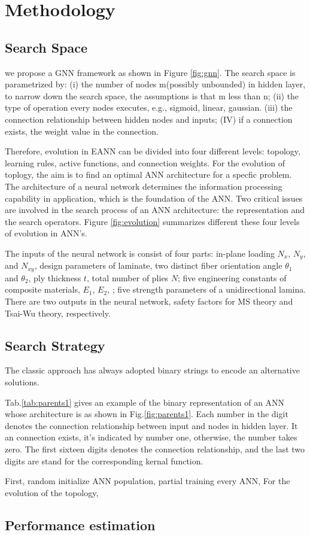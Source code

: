 \section{Methodology}

\subsection{Search Space}

we propose a GNN framework as shown in Figure \ref{fig:gnn}. The search space
is parametrized by: (i) the number of nodes m(possibly unbounded) in hidden
layer, to narrow down the search space, the assumptions is that m less than n; (ii) the type of
operation every nodes executes, e.g., sigmoid, linear, gaussian. (iii) the
connection relationship between hidden nodes and inputs; (IV) if a connection
exists, the weight value in the connection.

Therefore, evolution in EANN can be divided into four different levels: topology, learning
rules, active functions, and connection weights. For the evolution of toplogy,
the aim is to find an optimal ANN architecture for a specfic problem. The
architecture of a neural network determines the information processing
capability in application, which is the foundation of the ANN. Two critical
issues are involved in the search process of an ANN architecture: the
representation and the search operators.
Figure \ref{fig:evolution} summarizes different these four levels of evolution in ANN's.

The inputs of the neural network is consist of four parts: in-plane loading
$N_x$, $N_y$, and $N_{xy}$, design parameters of laminate, two distinct fiber
orientation angle $\theta_1$ and $\theta_2$, ply thickness $t$, total number of
plies $N$; five engineering constants of composite materials, $E_1$, $E_2$, ;
five strength parameters of a unidirectional lamina. There are two outputs in
the neural network, safety factors for MS theory and Tsai-Wu theory, respectively.

\subsection{Search Strategy}



The classic approach has always adopted binary strings to encode an alternative solutions. 


Tab.\ref{tab:parents1}  gives an example of the binary representation of an ANN
whose architecture is as shown in Fig.\ref{fig:parents1}. Each number in the
digit denotes the connection relationship between input and nodes in hidden
layer. It an connection exists, it's indicated by number one, otherwise, the
number takes zero. The first sixteen digits denotes the connection relationship, and the
last two digits are stand for  the corresponding kernal function. 

First,  random initialize ANN population, partial training every ANN, 
For the evolution of the topology,

\subsection{Performance estimation}
\cite{baker2017accelerating}








